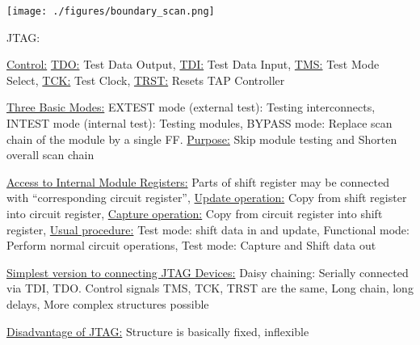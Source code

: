 \documentclass[landscape, a4paper]{article}
\begin{document}
\begin{minipage}[t]{0.2\linewidth}
\begin{betterlist}
		\texttt{[image: ./figures/boundary\_scan.png]}
		\item \alert{JTAG:}
		\begin{betterlist}
			\item \underline{Control:} \underline{TDO:} Test Data Output, \underline{TDI:} Test Data Input, \underline{TMS:} Test Mode Select, \underline{TCK:} Test Clock, \underline{TRST:} Resets TAP Controller
			\item \underline{Three Basic Modes:} \alert{EXTEST mode (external test):} Testing interconnects, \alert{INTEST mode (internal test):} Testing modules, \alert{BYPASS mode:} Replace scan chain of the module by a single FF. \underline{Purpose:} Skip module testing and Shorten overall scan chain
			\item \underline{Access to Internal Module Registers:} Parts of shift register may be connected with \enquote{corresponding circuit register}, \underline{Update operation:} Copy from shift register into circuit register, \underline{Capture operation:} Copy from circuit register into shift register, \underline{Usual procedure:} \alert{Test mode:} shift data in and update, \alert{Functional mode:} Perform normal circuit operations, \alert{Test mode:} Capture and Shift data out
			\item \underline{Simplest version to connecting JTAG Devices:} \alert{Daisy chaining:} Serially connected via TDI, TDO. Control signals TMS, TCK, TRST are the same, Long chain, long delays, More complex structures possible
			\item \underline{Disadvantage of JTAG:} Structure is basically fixed, inflexible
		\end{betterlist}
	\end{betterlist}
\end{minipage}
\end{document}
